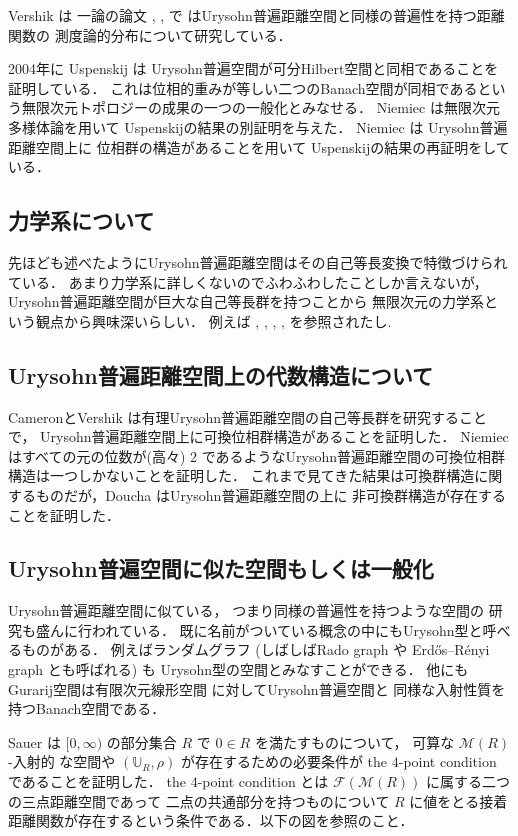 \documentclass[leqno, 12pt]{jsarticle}
\begin{document}
Vershik
は
一論の論文
 \cite{Ver0}, 
 \cite{Ver2002}, 
  \cite{Ver}
  で
はUrysohn普遍距離空間と同様の普遍性を持つ距離関数の
測度論的分布について研究している．

2004年に
Uspenskij  
\cite{Usp2004}は
Urysohn普遍空間が可分Hilbert空間と同相であることを証明している．
これは位相的重みが等しい二つのBanach空間が同相であるという無限次元トポロジーの成果の一つの一般化とみなせる．
Niemiec
 \cite{Nie2011}
 は無限次元多様体論を用いて
Uspenskijの結果の別証明を与えた．
Niemiec 
\cite{Nie2013}
は
Urysohn普遍距離空間上に
位相群の構造があることを用いて
Uspenskijの結果の再証明をしている．


\subsection{力学系について}
先ほども述べたようにUrysohn普遍距離空間はその自己等長変換で特徴づけられている．
あまり力学系に詳しくないのでふわふわしたことしか言えないが，
Urysohn普遍距離空間が巨大な自己等長群を持つことから
無限次元の力学系という観点から興味深いらしい．
例えば 
\cite{Mell2008},
 \cite{LS},  
 \cite{Sau2}, 
 \cite{Pestov1}, 
 \cite{Pesrov2}
 を参照されたし.



\subsection{Urysohn普遍距離空間上の代数構造について}
 CameronとVershik
 \cite{CV}
 は有理Urysohn普遍距離空間の自己等長群を研究することで，
 Urysohn普遍距離空間上に可換位相群構造があることを証明した．
 Niemiec 
 \cite{Niefun}
 はすべての元の位数が(高々) 
 $2$
 であるようなUrysohn普遍距離空間の可換位相群構造は一つしかないことを証明した．
 これまで見てきた結果は可換群構造に関するものだが，Doucha 
 \cite{Doucha}
 はUrysohn普遍距離空間の上に
 非可換群構造が存在することを証明した．


\subsection{Urysohn普遍空間に似た空間もしくは一般化}
Urysohn普遍距離空間に似ている，
つまり同様の普遍性を持つような空間の
研究も盛んに行われている．
既に名前がついている概念の中にもUrysohn型と呼べるものがある．
例えばランダムグラフ
(しばしばRado graph
や
Erd\H{o}s--R\'{e}nyi graph
とも呼ばれる)
も
Urysohn型の空間とみなすことができる．
他にもGurarij空間は有限次元線形空間
に対してUrysohn普遍空間と
同様な入射性質を持つBanach空間である．


Sauer \cite{Sau}
は
$[0, \infty)$
 の部分集合
 $R$
 で
 $0\in R$
 を満たすものについて，
可算な
$\mathscr{M}(R)$-入射的
な空間や
$(\mathbb{U}_R, \rho)$
が存在するための必要条件が
the 
$4$-point condition
 であることを証明した．
the 
$4$-point condition 
とは
$\mathscr{F}(\mathscr{M}(R))$
に属する二つの三点距離空間であって
二点の共通部分を持つものについて
$R$
に値をとる接着距離関数が存在するという条件である．以下の図を参照のこと．
\end{document}
